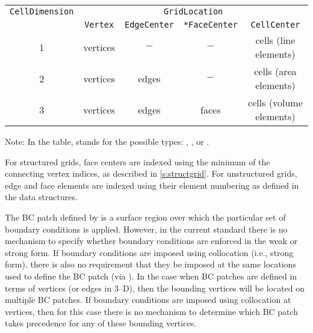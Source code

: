 \begin{center}
\begin{tabular}{||c|c|c|c|c||}
 \hline
\texttt{CellDimension} & \multicolumn{4}{c||}{\texttt{GridLocation}} \\
& \texttt{Vertex} & \texttt{EdgeCenter} & \texttt{*FaceCenter} & \texttt{CellCenter} \\
 \hline
1 & vertices & $-$ & $-$     & cells (line elements) \\
2 & vertices & edges & $-$   & cells (area elements) \\
3 & vertices & edges & faces & cells (volume elements) \\
 \hline
\end{tabular}
\end{center}

Note: In the table,  stands for the possible types: ,
,  or .

For structured grids, face centers are indexed using the minimum of the
connecting vertex indices, as described in \autoref{s:structgrid}.  For
unstructured grids, edge and face elements are indexed using their element
numbering as defined in the  data structures.

The BC patch defined by  is a surface region over which
the particular set of boundary conditions is applied.  However, in the current
standard there is no mechanism to specify whether boundary conditions are
enforced in the weak or strong form.  If boundary conditions are imposed using
collocation (i.e., strong form), there is also no requirement that they be
imposed at the same locations used to define the BC patch (via
).  In the case when BC patches are defined in terms of
vertices (or edges in 3--D), then the bounding vertices will be located on
multiple BC patches.  If boundary conditions are imposed using collocation at
vertices, then for this case there is no mechanism to determine which BC patch
takes precedence for any of these bounding vertices.

